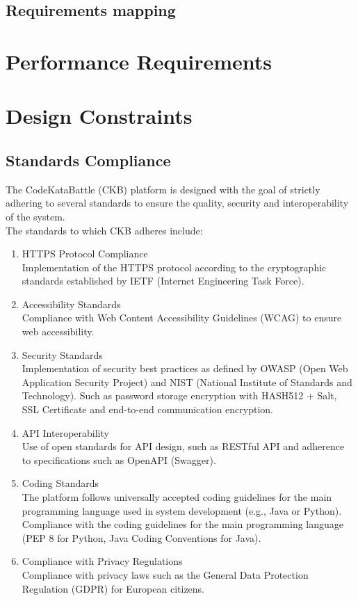 \subsection{Requirements mapping}
\section{Performance Requirements}

\section{Design Constraints}
\subsection{Standards Compliance}
The CodeKataBattle (CKB) platform is designed with the goal of strictly adhering to several standards to ensure the quality, security and interoperability of the system.\\ The standards to which CKB adheres include:

\begin{enumerate}
    \item HTTPS Protocol Compliance\\
          Implementation of the HTTPS protocol according to the cryptographic standards established by IETF (Internet Engineering Task Force).

    \item Accessibility Standards\\
          Compliance with Web Content Accessibility Guidelines (WCAG) to ensure web accessibility.

    \item Security Standards\\
          Implementation of security best practices as defined by OWASP (Open Web Application Security Project) and NIST (National Institute of Standards and Technology).
          Such as password storage encryption with HASH512 + Salt, SSL Certificate and end-to-end communication encryption.


    \item API Interoperability\\
          Use of open standards for API design, such as RESTful API and adherence to specifications such as OpenAPI (Swagger).


    \item Coding Standards\\
          The platform follows universally accepted coding guidelines for the main programming language used in system development (e.g., Java or Python).
          Compliance with the coding guidelines for the main programming language (PEP 8 for Python, Java Coding Conventions for Java).


    \item Compliance with Privacy Regulations\\
          Compliance with privacy laws such as the General Data Protection Regulation (GDPR) for European citizens.
\end{enumerate}

